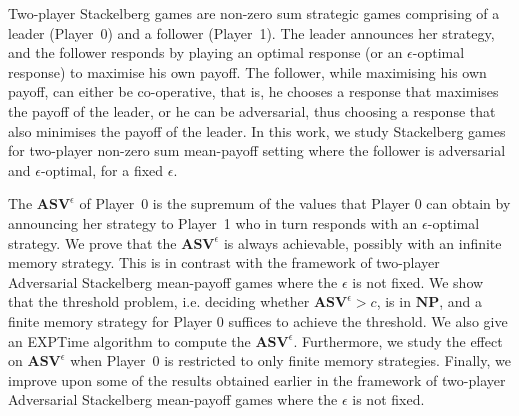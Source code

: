 Two-player Stackelberg games are non-zero sum strategic games comprising of a leader (Player~0) and a follower (Player~1). The leader announces her strategy, and the follower responds by playing an optimal response (or an $\epsilon$-optimal response) to maximise his own payoff. The follower, while maximising his own payoff, can either be co-operative, that is, he chooses a response that maximises the payoff of the leader, or he can be adversarial, thus choosing a response that also minimises the payoff of the leader. In this work, we study Stackelberg games for two-player non-zero sum mean-payoff setting where the follower is adversarial and $\epsilon$-optimal, for a fixed $\epsilon$.

The $\mathbf{ASV}^{\epsilon}$ of Player~0 is the supremum of the values that Player 0 can obtain by announcing her strategy to Player~1 who in turn responds with an $\epsilon$-optimal strategy.
We prove that the $\mathbf{ASV}^{\epsilon}$ is always achievable, possibly with an infinite memory strategy.
This is in contrast with the framework of two-player Adversarial Stackelberg mean-payoff games where the $\epsilon$ is not fixed.
We show that the threshold problem, i.e. deciding whether $\mathbf{ASV}^{\epsilon} > c$, is in $\textbf{NP}$, and a finite memory strategy for Player 0 suffices to achieve the threshold.
We also give an {\sf EXPTime} algorithm to compute the $\mathbf{ASV}^{\epsilon}$.
Furthermore, we study the effect on $\mathbf{ASV}^{\epsilon}$ when Player~0 is restricted to only finite memory strategies.
Finally, we improve upon some of the results obtained earlier in the framework of two-player Adversarial Stackelberg mean-payoff games where the $\epsilon$ is not fixed.